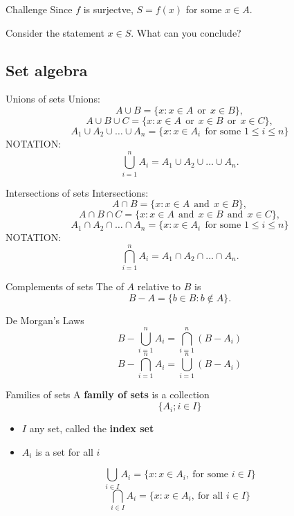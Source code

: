 \documentclass{beamer}
\begin{document}
\begin{frame}{Challenge}
\pause
Since $f$ is surjectve, $S = f(x)$ for some $x\in A$.
\pause
\begin{prob}
Consider the statement $x\in S$.  What can you conclude?
\end{prob}
\end{frame}


\subsection{Set algebra}

\begin{frame}{Unions of sets}
Unions:
\pause
$$A\cup B = \{x: x\in A\ \ \text{or}\ \ x\in B\},$$
\pause
$$A\cup B\cup C = \{x: x\in A\ \ \text{or}\ \ x\in B\ \ \text{or}\ \ x\in C\},$$
\pause
$$A_1\cup A_2\cup \dots \cup A_n = \{x: x\in A_i\ \ \text{for some $1\leq i\leq n$}\}$$
\pause
{\color{red}NOTATION:}
$$\bigcup_{i=1}^n A_i = A_1\cup A_2\cup \dots \cup A_n.$$
\end{frame}

\begin{frame}{Intersections of sets}
Intersections:
\pause
$$A\cap B = \{x: x\in A\ \ \text{and}\ \ x\in B\},$$
\pause
$$A\cap B\cap C = \{x: x\in A\ \ \text{and}\ \ x\in B\ \ \text{and}\ \ x\in C\},$$
\pause
$$A_1\cap A_2\cap \dots \cap A_n = \{x: x\in A_i\ \ \text{for some $1\leq i\leq n$}\}$$
\pause
{\color{red}NOTATION:}
$$\bigcap_{i=1}^n A_i = A_1\cap A_2\cap \dots \cap A_n.$$
\end{frame}

\begin{frame}{Complements of sets}
\pause
The  of $A$ relative to $B$ is
$$B-A = \{b\in B: b\notin A\}.$$
\pause
\begin{thm}{De Morgan's Laws}
\pause
$$B-\bigcup_{i=1}^n A_i = \bigcap_{i=1}^n (B-A_i)$$
\pause
$$B-\bigcap_{i=1}^n A_i = \bigcup_{i=1}^n (B-A_i)$$
\end{thm}
\end{frame}


\begin{frame}{Families of sets}
A \textbf{family of sets} is a collection
$$\{A_i; i\in I\}$$
\begin{itemize}
\pause
\item $I$ any set, called the \textbf{index set}
\pause
\item $A_i$ is a set for all $i$
\end{itemize}
\pause
$$\bigcup_{i\in I} A_i = \{x: x\in A_i,\ \text{for some $i\in I$}\}$$
\pause
$$\bigcap_{i\in I} A_i = \{x: x\in A_i,\ \text{for all $i\in I$}\}$$
\end{frame}
\end{document}
